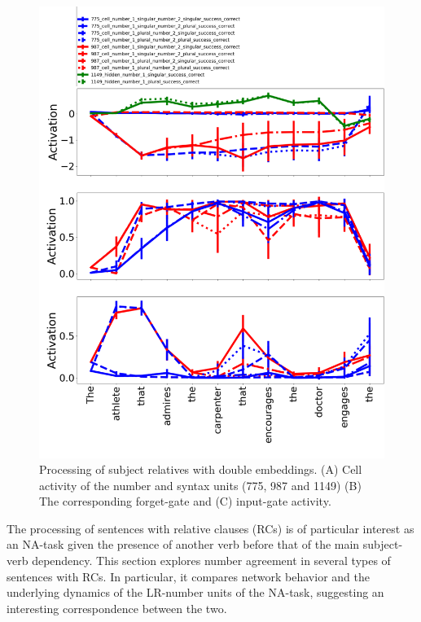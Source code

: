 \begin{figure}[b]
\centering
\includegraphics[width=\linewidth]{Figures/Figure9_doubleRC.png}
\caption{Processing of subject relatives with double embeddings. (A) Cell activity of the number and syntax units (775, 987 and 1149) (B) The corresponding forget-gate and (C) input-gate activity.}
\end{figure}

The processing of sentences with relative clauses (RCs) is of particular interest as an NA-task given the presence of another verb before that of the main subject-verb dependency. This section explores number agreement in several types of sentences with RCs. In particular, it compares network behavior and the underlying dynamics of the LR-number units of the NA-task, suggesting an interesting correspondence between the two.

